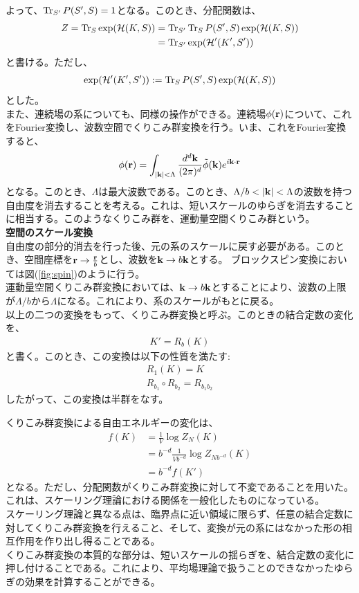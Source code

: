 \documentclass[a4paper,11pt]{jsarticle}
\numberwithin{equation}{section}
\begin{document}
よって、$\Tr_{S'} P(S',S) = 1$となる。このとき、分配関数は、
\begin{align}
    Z = \Tr_S \exp(\mathcal{H}(K,S)) &= \Tr_{S'} \Tr_S P(S',S) \exp(\mathcal{H}(K,S))\\
    &= \Tr_{S'} \exp(\mathcal{H}'(K',S'))
\end{align}
と書ける。ただし、
\begin{align}
    \exp(\mathcal{H}'(K',S')) := \Tr_S P(S',S) \exp(\mathcal{H}(K,S))
\end{align}
とした。\\
また、連続場の系についても、同様の操作ができる。連続場$\phi(\vb{r})$について、これをFourier変換し、波数空間でくりこみ群変換を行う。いま、これをFourier変換すると、
\begin{align}
    \phi(\vb{r}) = \int_{|\vb{k}| < \Lambda} \frac{d^d \vb{k}}{(2\pi)^d} \tilde{\phi}(\vb{k}) e^{i\vb{k}\cdot \vb{r}}
\end{align}
となる。このとき、$\Lambda$は最大波数である。このとき、$\Lambda/b < |\vb{k}| < \Lambda$の波数を持つ自由度を消去することを考える。これは、短いスケールのゆらぎを消去することに相当する。このようなくりこみ群を、運動量空間くりこみ群という。\\

\textbf{空間のスケール変換}\\
自由度の部分的消去を行った後、元の系のスケールに戻す必要がある。このとき、空間座標を$\vb{r} \to \frac{\vb{r}}{b}$とし、波数を$\vb{k} \to b\vb{k}$とする。
ブロックスピン変換においては図(\ref{fig:spin})のように行う。\\
運動量空間くりこみ群変換においては、$\vb{k} \to b\vb{k}$とすることにより、波数の上限が$\Lambda/b$から$\Lambda$になる。これにより、系のスケールがもとに戻る。\\

以上の二つの変換をもって、くりこみ群変換と呼ぶ。このときの結合定数の変化を、
\begin{align}
    K' = R_b(K)
\end{align}
と書く。このとき、この変換は以下の性質を満たす:
\begin{align}
    R_1(K) = K\\
    R_{b_1} \circ R_{b_2} = R_{b_1b_2}
\end{align}
したがって、この変換は半群をなす。

くりこみ群変換による自由エネルギーの変化は、
\begin{align}
    f(K) &= \frac{1}{V} \log Z_N(K)\\
    &=b^{-d} \frac{1}{Vb^{-d}} \log Z_{Nb^{-d}}(K)\\
    &= b^{-d} f(K')
\end{align}
となる。ただし、分配関数がくりこみ群変換に対して不変であることを用いた。これは、スケーリング理論における関係を一般化したものになっている。\\
スケーリング理論と異なる点は、臨界点に近い領域に限らず、任意の結合定数に対してくりこみ群変換を行えること、そして、変換が元の系にはなかった形の相互作用を作り出し得ることである。\\
くりこみ群変換の本質的な部分は、短いスケールの揺らぎを、結合定数の変化に押し付けることである。これにより、平均場理論で扱うことのできなかったゆらぎの効果を計算することができる。\\
\end{document}
